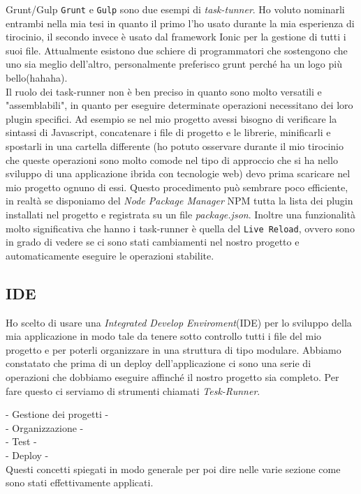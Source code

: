 Grunt/Gulp \texttt{Grunt} e \texttt{Gulp} sono due esempi di \emph{task-tunner}. Ho voluto nominarli entrambi nella mia tesi in quanto il primo l'ho usato durante la mia esperienza di tirocinio, il secondo invece è usato dal framework  Ionic per la gestione di tutti i suoi file. Attualmente esistono due schiere di programmatori che sostengono che uno sia meglio dell'altro, personalmente preferisco grunt perché ha un logo più bello(hahaha).\\
Il ruolo dei task-runner non è ben preciso in quanto sono molto versatili e "assemblabili", in quanto per eseguire determinate operazioni necessitano dei loro plugin specifici. Ad esempio se nel mio progetto avessi bisogno di verificare la sintassi di Javascript, concatenare i file di progetto e le librerie, minificarli e spostarli in una cartella differente (ho potuto osservare durante il mio tirocinio che queste operazioni sono molto comode nel tipo di approccio che si ha nello sviluppo di una applicazione ibrida con tecnologie web) devo prima scaricare nel mio progetto ognuno di essi. Questo procedimento può sembrare poco efficiente, in realtà se disponiamo del \emph{Node Package Manager} NPM tutta la lista dei plugin installati nel progetto e registrata su un file \emph{package.json}. Inoltre una funzionalità molto significativa che hanno i task-runner è quella del \texttt{Live Reload}, ovvero sono in grado di vedere se ci sono stati cambiamenti nel nostro progetto e automaticamente eseguire le operazioni stabilite.

\subsection{IDE}
Ho scelto di usare una \emph{Integrated Develop Enviroment}(IDE) per lo sviluppo della mia applicazione in modo tale da tenere sotto controllo tutti i file del mio progetto e per poterli organizzare in una struttura di tipo modulare. Abbiamo constatato che prima di un deploy dell'applicazione ci sono una serie di operazioni che dobbiamo eseguire affinché il nostro progetto sia completo. Per fare questo ci serviamo di strumenti chiamati \emph{Tesk-Runner}.

- Gestione dei progetti -\\
- Organizzazione -\\
- Test -\\
- Deploy -\\
Questi concetti spiegati in modo generale per poi dire nelle varie sezione come sono stati effettivamente applicati.

